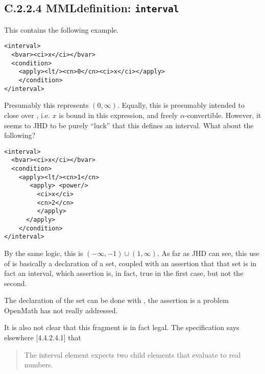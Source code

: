 \documentclass{llncs}
\begin{document}
{\subsection{C.2.2.4 MMLdefinition: {\tt interval}}\label{C224}
This contains the following example.
\begin{lstlisting}[language=MathML2]
<interval>
  <bvar><ci>x</ci></bvar>
  <condition>
    <apply><lt/><cn>0</cn><ci>x</ci></apply>
    </condition>
</interval>
\end{lstlisting}
Presumably this represents $(0,\infty)$. Equally, this is presumably intended
to close over {}, i.e. $x$ is bound in this expression, and
freely $\alpha$-convertible. However, it seems to JHD to be purely ``luck''
that this defines an interval. What about the following?
\begin{lstlisting}[language=MathML2]
<interval>
  <bvar><ci>x</ci></bvar>
  <condition>
    <apply><lt/><cn>1</cn>
       <apply> <power/>
         <ci>x</ci>
         <cn>2</cn>
         </apply>
      </apply>
    </condition>
</interval>
\end{lstlisting}
By the same logic, this is $(-\infty,-1)\cup(1,\infty)$.  As far as JHD can
see, this use of {} is basically a declaration of a set, coupled
with an assertion that that set is in fact an interval, which assertion is, in
fact, true in the first case, but not the second.
\par
The declaration of the set can be done with {}, the assertion is
a problem OpenMath has not really addressed.
\par
It is also not clear that this fragment is in fact legal. The specification
says elsewhere [4.4.2.4.1] that
\begin{quotation}\noindent
The interval element expects two child elements that evaluate to real numbers. 
\end{quotation} 
}
\end{document}

